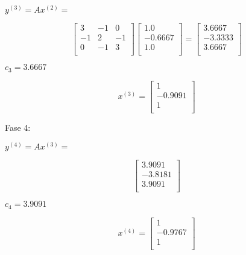 \begin{center} 
$y^{(3)} = Ax^{(2)} =$
\end{center}
\[
  \left[ {\begin{array}{ccc}
   3 & -1 & 0 \\
   -1 & 2 & -1 \\
   0 & -1 & 3 \\
  \end{array} } \right]
  \left[ {\begin{array}{c}
   1.0  \\
   -0.6667 \\
   1.0  \\
  \end{array} } \right]
  = 
    \left[ {\begin{array}{c}
   3.6667 \\
   -3.3333 \\
   3.6667 \\
  \end{array} } \right]
\]
\begin{center} 
$c_3 = 3.6667$ 


\[
x^{(3)} =
  \left[ {\begin{array}{c}
   1  \\
   -0.9091 \\
   1 \\
  \end{array} } \right]
\]

\end{center}


Fase 4: 

\begin{center} 
$y^{(4)} = Ax^{(3)} =$
\end{center}
\[ 
    \left[ {\begin{array}{c}
   3.9091 \\
   -3.8181 \\
   3.9091 \\
  \end{array} } \right]
\]
\begin{center} 
$c_4 = 3.9091$ 


\[
x^{(4)} = 
  \left[ {\begin{array}{c}
   1  \\
   -0.9767 \\
   1 \\
  \end{array} } \right]
\]

\end{center}


